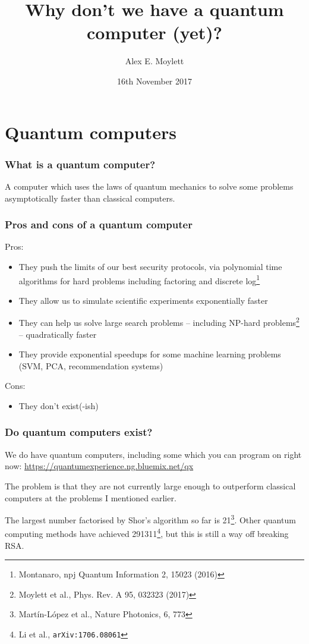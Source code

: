 \documentclass[notes]{beamer}
\title[Why don't we have a quantum computer?]{Why don't we have a quantum computer (yet)?} %
\author[Alex E. Moylett]{Alex E. Moylett} %
\institute[University of Bristol] %
{
Quantum Engineering Technology Labs and Quantum Engineering Centre for Doctoral Training\\
University of Bristol \\ %
\medskip
\textit{\href{mailto:alex.moylett@bristol.ac.uk}{alex.moylett@bristol.ac.uk}} %
}
\date{16th November 2017} %
\begin{document}
\begin{frame}
\titlepage %
\end{frame}


\section{Quantum computers}

\begin{frame}
\frametitle{What is a quantum computer?}
A computer which uses the laws of quantum mechanics to solve some problems asymptotically faster than classical computers.
\end{frame}

\begin{frame}
\frametitle{Pros and cons of a quantum computer}

Pros:
\begin{itemize}
\item<2-> They push the limits of our best security protocols, via polynomial time algorithms for hard problems including factoring and discrete log\footnote{Montanaro, npj Quantum Information 2, 15023 (2016)}
\item<3-> They allow us to simulate scientific experiments exponentially faster
\item<4-> They can help us solve large search problems -- including NP-hard problems\footnote{Moylett et al., Phys. Rev. A 95, 032323 (2017)} -- quadratically faster
\item<5-> They provide exponential speedups for some machine learning problems (SVM, PCA, recommendation systems)
\end{itemize}

Cons:
\begin{itemize}
\item<6-> They don't exist(-ish)
\end{itemize}
\end{frame}

\begin{frame}
\frametitle{Do quantum computers exist?}

We do have quantum computers, including some which you can program on right now: \url{https://quantumexperience.ng.bluemix.net/qx}

The problem is that they are not currently large enough to outperform classical computers at the problems I mentioned earlier.

The largest number factorised by Shor's algorithm so far is 21\footnote{Mart\'in-L\'opez et al., Nature Photonics, 6, 773}. Other quantum computing methods have achieved 291311\footnote{Li et al., {\tt arXiv:1706.08061}}, but this is still a way off breaking RSA.
\end{frame}
\end{document}
